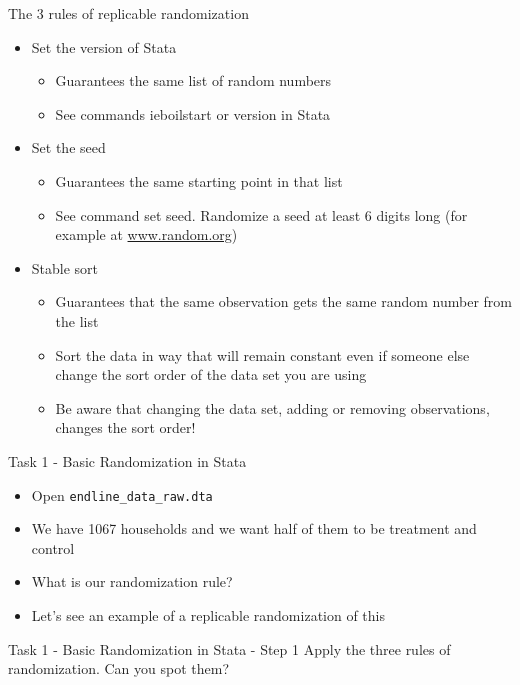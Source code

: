 \documentclass[aspectratio=169]{beamer}
\newcommand{\codeexample}[2]{
	\begin{figure}
		\VerbatimInput[
		framesep=3mm,
		frame=lines, %
		numbers=left, %
		label= #1, %
		baselinestretch=0.90, %
		]{#2} %
	\end{figure}
	\FloatBarrier
}
\begin{document}
\begin{frame}{The 3 rules of replicable randomization}
	\begin{itemize}
		\item Set the version of Stata
		\begin{itemize}
			\item Guarantees the same list of random numbers
			\item See commands ieboilstart or version in Stata
		\end{itemize}
		\item Set the seed
		\begin{itemize}
			\item 	Guarantees the same starting point in that list
			\item See command set seed. Randomize a seed at least 6 digits long (for example at \url{www.random.org})
		\end{itemize}
		\item Stable sort
		\begin{itemize}
			\item Guarantees that the same observation gets the same random number from the list
			\item Sort the data in way that will remain constant even if someone else change the sort order of the data set you are using
			\item Be aware that changing the data set, adding or removing observations, changes the sort order!
		\end{itemize}
	\end{itemize}
\end{frame}



\begin{frame}{Task 1 - Basic Randomization in Stata}
	\begin{itemize}
		\item Open \texttt{endline\_data\_raw.dta}
		\item We have 1067 households and we want half of them to be treatment and control
		\item What is our randomization rule?
		\item Let’s see an example of a replicable randomization of this
	\end{itemize}
\end{frame}

\begin{frame}{Task 1 - Basic Randomization in Stata - Step 1}
	Apply the three rules of randomization. Can you spot them?
	\codeexample{randomization-1.do}{code/randomization-1.do}
\end{frame}
\end{document}
